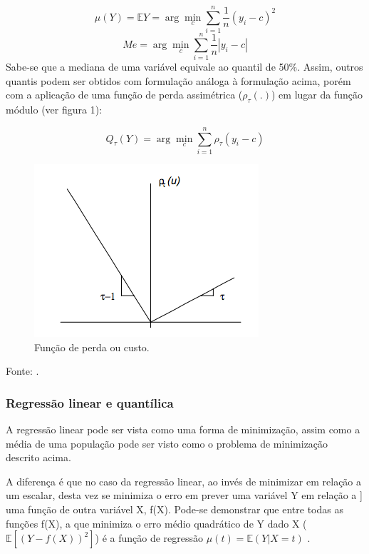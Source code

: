 \documentclass[a4paper, 12pt]{article}
\newcommand{\bcenter}{\begin{center}}
\newcommand{\ecenter}{\end{center}}
\begin{document}
\[\mu(Y) = \mathbb{E}Y = \arg \min_c \sum_{i = 1}^n \frac{1}{n}(y_i - c)^2\]
\[Me = \arg \min_c \sum_{i = 1}^n \frac{1}{n}|y_i - c|\] Sabe-se que a
mediana de uma variável equivale ao quantil de 50\%. Assim, outros
quantis podem ser obtidos com formulação análoga à formulação acima,
porém com a aplicação de uma função de perda assimétrica
(\(\rho_\tau(.)\)) em lugar da função módulo (ver figura 1):

\[Q_\tau(Y) = \arg \min_c \sum_{i = 1}^n \rho_\tau(y_i - c)\]

\begin{figure}[H]

{\centering \includegraphics[width=0.7\linewidth]{DmKq7} 

}

\caption{Função de perda ou custo.}\label{fig:unnamed-chunk-1}
\end{figure}

\bcenter Fonte: \textcite{qr}. \ecenter

\hypertarget{regressao-linear-e-quantilica}{%
\subsubsection{Regressão linear e
quantílica}\label{regressao-linear-e-quantilica}}

A regressão linear pode ser vista como uma forma de minimização, assim
como a média de uma população pode ser visto como o problema de
minimização descrito acima.

A diferença é que no caso da regressão linear, ao invés de minimizar em
relação a um escalar, desta vez se minimiza o erro em prever uma
variável Y em relação a {]} uma função de outra variável X, f(X).
Pode-se demonstrar que entre todas as funções f(X), a que minimiza o
erro médio quadrático de Y dado X (\(\mathbb{E}[(Y - f(X))^2]\)) é a
função de regressão \(\mu(t) = \mathbb{E}(Y|X=t)\)
\autocite[49-50]{matloff2017}.
\end{document}
